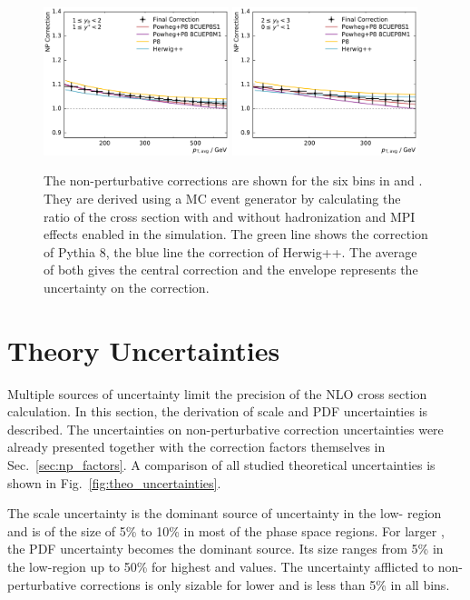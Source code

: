 \begin{figure}[htp]
    \includegraphics[width=0.48\textwidth]{figures/theory/np_factors_nlo_final_yb1ys1.pdf}\hfill
    \includegraphics[width=0.48\textwidth]{figures/theory/np_factors_nlo_final_yb2ys0.pdf}
    \caption[Non-perturbative corrections]{The non-perturbative corrections are
        shown for the six bins in \ystar and \yboost. They are derived using a MC event
        generator by calculating the ratio of the cross section with and without
        hadronization and MPI effects enabled in the simulation. The green line
        shows the correction of Pythia 8, the blue line the correction of
    Herwig++. The average of both gives the central correction and the envelope
represents the uncertainty on the correction.}
    \label{fig:np_factors}
\end{figure}

\section{Theory Uncertainties}

Multiple sources of uncertainty limit the precision of the NLO cross section
calculation. In this section, the derivation of scale and PDF
uncertainties is described. The uncertainties
on non-perturbative correction uncertainties were already presented together
with the correction factors themselves in Sec.~\ref{sec:np_factors}. A
comparison of all studied theoretical uncertainties is shown in
Fig.~\ref{fig:theo_uncertainties}.

The scale uncertainty is the dominant source of uncertainty in the low-\pt
region and is of the size of 5\% to 10\% in most of the phase space regions. For
larger \ptavg, the PDF uncertainty becomes the dominant source. Its size ranges
from 5\% in the low-\ptavg region up to 50\% for highest \ptavg and \yboost
values. The uncertainty afflicted to non-perturbative corrections is only
sizable for lower \pt and is less than 5\% in all bins.

